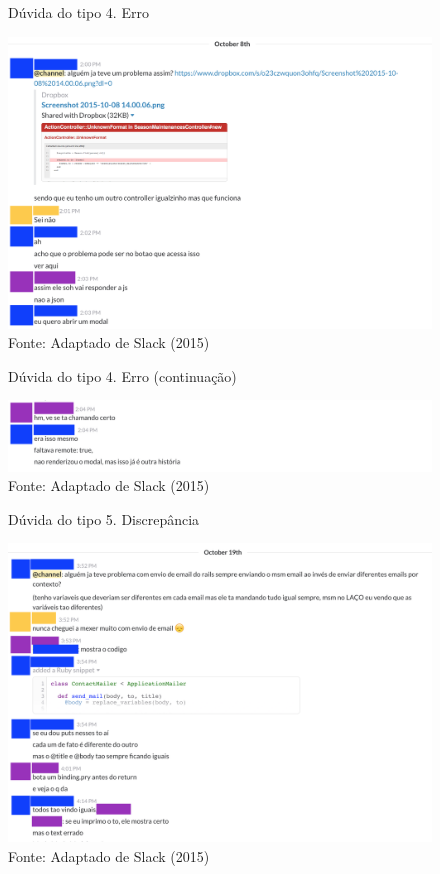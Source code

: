\begin{figure}[h!]
	\centering
    \caption{Dúvida do tipo 4. Erro}
		\label{fig:doubt-4-1}
    \includegraphics[width=15cm]{Imagens/c-type-4-1-1.png}
	\caption*{Fonte: Adaptado de Slack (2015)}
\end{figure}

\begin{figure}[h!]
	\centering
    \caption{Dúvida do tipo 4. Erro (continuação)}
		\label{fig:doubt-4-2}
    \includegraphics[width=15cm]{Imagens/c-type-4-1-2.png}
	\caption*{Fonte: Adaptado de Slack (2015)}
\end{figure}

\begin{figure}[h!]
	\centering
    \caption{Dúvida do tipo 5. Discrepância}
		\label{fig:doubt-5}
    \includegraphics[width=15cm]{Imagens/c-type-5-2-1.png}
	\caption*{Fonte: Adaptado de Slack (2015)}
\end{figure}

